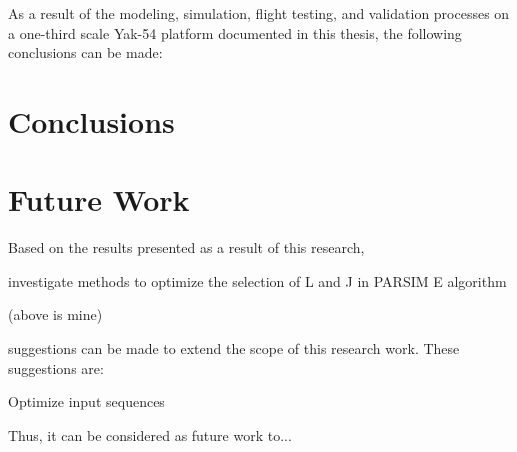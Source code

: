 As a result of the modeling, simulation, flight testing, and validation processes on a one-third scale Yak-54 platform documented in this thesis, the following conclusions can be made:

\section{Conclusions}



\section{Future Work}
Based on the results presented as a result of this research, 

investigate methods to optimize the selection of L and J in PARSIM E algorithm


(above is mine)





suggestions can be made to extend the scope of this research work. These suggestions are:


Optimize input sequences

Thus, it can be considered as future work to...
